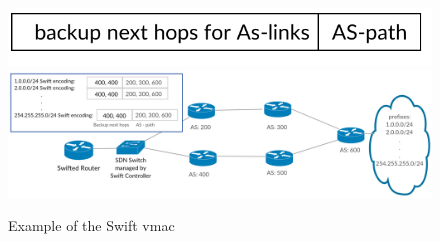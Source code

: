 \begin{figure}[h]
\center
\includegraphics[scale = 0.6]{Figures/bckgrnd_swift_vmac_cropped.pdf}
\includegraphics[scale = 0.24]{Figures/bckgrnd_swift_topology.pdf}
\caption{Example of the Swift vmac}
\label{fig:swift_vmac}
\end{figure}








